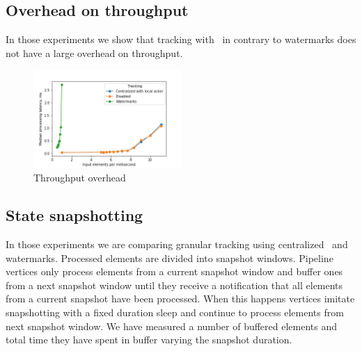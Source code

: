\subsection{Overhead on throughput}

In those experiments we show that tracking with \tracker\ in contrary to watermarks does not have a large overhead on throughput.

\begin{figure}[htbp]
  \centering
  \includegraphics[width=0.50\textwidth]{throughput_overhead.png}
  \caption{Throughput overhead}
\end{figure}

\subsection{State snapshotting}

In those experiments we are comparing granular tracking using centralized \tracker\ and watermarks. Processed elements are divided into snapshot windows. Pipeline vertices only process elements from a current snapshot window and buffer ones from a next snapshot window until they receive a notification that all elements from a current snapshot have been processed. When this happens vertices imitate snapshotting with a fixed duration sleep and continue to process elements from next snapshot window. We have measured a number of buffered elements and total time they have spent in buffer varying the snapshot duration.

